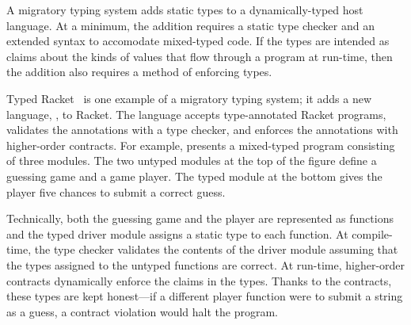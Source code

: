 A migratory typing system adds static types to a
dynamically-typed host language.
At a minimum, the addition requires a static type checker and an extended
syntax to accomodate mixed-typed code.
If the types are intended as claims about the kinds of values that
flow through a program at run-time, then the addition also requires a method
of enforcing types.

Typed Racket~\cite{tf-popl-2008} is one example of a migratory typing system; it adds
a new language, , to Racket.
The language accepts type-annotated Racket programs,
validates the annotations with a type checker,
and enforces the annotations with higher-order contracts.
For example,  presents a mixed-typed
program consisting of three modules.
The two untyped modules at the top of the figure define a guessing game
and a game player.
The typed module at the bottom gives the player five chances to submit a
correct guess.

Technically, both the guessing game and the player are represented as functions
and the typed driver module assigns a static type to each function.
At compile-time, the type checker validates the contents of the driver module
assuming that the types assigned to the untyped functions are correct.
At run-time, higher-order contracts dynamically enforce the claims in the types.
Thanks to the contracts, these types are kept honest---if a different player
function were to submit a string as a guess, a contract violation would halt
the program.

